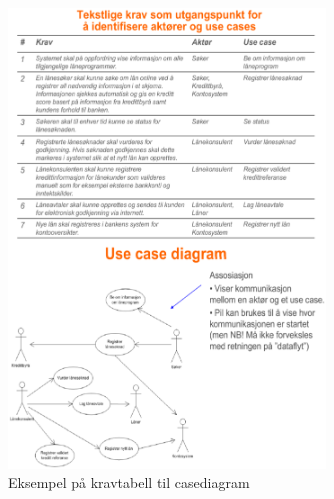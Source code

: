 \documentclass[11pt]{article}
\begin{document}
   \begin{figure}[htb]
   \centering
   \includegraphics[width=0.75\textwidth]{./kravogcase.eps}
   \caption{\label{fig:kravogcase}Eksempel på kravtabell til casediagram}
   \end{figure}
\end{document}

